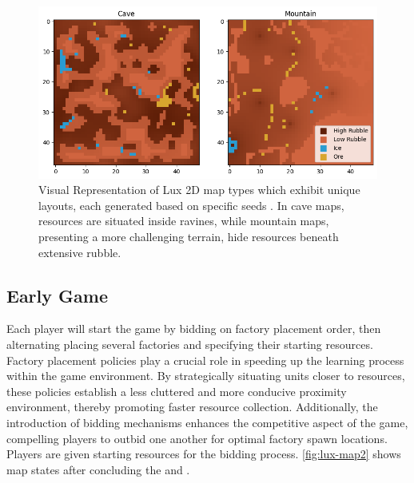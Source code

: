\begin{figure}[htbp]
    \centering
    \includegraphics[width=1\linewidth]{images/intro_luxenv/map/resources.png}
    \captionsetup{justification=justified, singlelinecheck=false, width=1\linewidth, labelfont=bf}    
    \caption{Visual Representation of Lux 2D map types which exhibit unique layouts, each generated based on specific seeds \protect\footnotemark. In cave maps, resources are situated inside ravines, while mountain maps, presenting a more challenging terrain, hide resources beneath extensive rubble.}
    \label{fig:lux-map}
\end{figure}


\subsection{Early Game}
\label{subsec:early-game}

\noindent Each player will start the game by bidding on factory placement order, then alternating placing several factories and specifying their starting resources. Factory placement policies play a crucial role in speeding up the learning process within the game environment. By strategically situating units closer to resources, these policies establish a less cluttered and more conducive proximity environment, thereby promoting faster resource collection. Additionally, the introduction of bidding mechanisms enhances the competitive aspect of the game, compelling players to outbid one another for optimal factory spawn locations. Players are given starting resources for the bidding process. \textcolor{deepblue}{\autoref{fig:lux-map2}} shows map states after concluding the  and .

